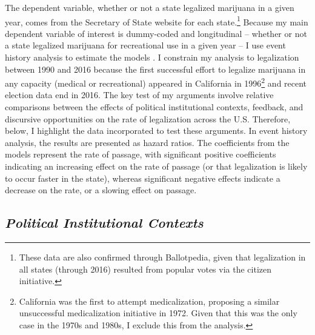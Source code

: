 The dependent variable, whether or not a state legalized marijuana in a given year, comes from the Secretary of State website for each state.\footnote{These data are also confirmed through Ballotpedia, given that legalization in all states (through 2016) resulted from popular votes via the citizen initiative.} Because my main dependent variable of interest is dummy-coded and longitudinal -- whether or not a state legalized marijuana for recreational use in a given year -- I use event history analysis to estimate the models \citep{box-steffensmeier_and_jones_1997,box-steffensmeier_and_jones_2004}. I constrain my analysis to legalization between 1990 and 2016 because the first successful effort to legalize marijuana in any capacity (medical or recreational) appeared in California in 1996\footnote{California was the first to attempt medicalization, proposing a similar unsuccessful medicalization initiative in 1972. Given that this was the only case in the 1970s and 1980s, I exclude this from the analysis.} and recent election data end in 2016. The key test of my arguments involve relative comparisons between the effects of political institutional contexts, feedback, and discursive opportunities on the rate of legalization across the U.S. Therefore, below, I highlight the data incorporated to test these arguments. In event history analysis, the results are presented as hazard ratios. The coefficients from the models represent the rate of passage, with significant positive coefficients indicating an increasing effect on the rate of passage (or that legalization is likely to occur faster in the state), whereas significant negative effects indicate a decrease on the rate, or a slowing effect on passage. 





%

\subsection{\it{Political Institutional Contexts}}

